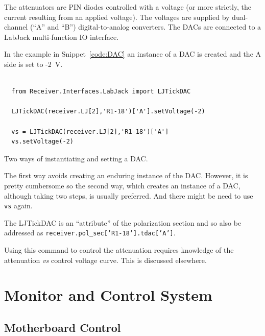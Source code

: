 \documentclass[letterpaper,11pt]{book}
\begin{document}
The attenuators are PIN diodes
controlled with a voltage (or more strictly, the current resulting from an
applied voltage).  The voltages are supplied by dual-channel (``A'' and
``B'') digital-to-analog converters.  The DACs are connected to a LabJack
multi-function IO interface.

In the example in Snippet~\ref{code:DAC}
an instance of a DAC is created and the A side is set to -2~V.
\begin{code}[h!tb]
\begin{center}
\begin{verbatim}

  from Receiver.Interfaces.LabJack import LJTickDAC
  
  LJTickDAC(receiver.LJ[2],'R1-18')['A'].setVoltage(-2)
  
  vs = LJTickDAC(receiver.LJ[2],'R1-18')['A']
  vs.setVoltage(-2)\end{verbatim}
\caption{\label{code:DAC}Two ways of instantiating and setting a DAC.}  
\end{center}
\end{code}
The first way avoids creating an enduring instance of the DAC.  However, it is
pretty cumbersome so the second way, which creates an instance of a DAC,
although taking two steps, is usually preferred.  And there might be need to
use {\tt vs} again.

The LJTickDAC is an ``attribute'' of the polarization section and so also be 
addressed as {\tt receiver.pol\_sec['R1-18'].tdac['A']}.

Using this command to control the attenuation requires knowledge of the 
attenuation {\it vs} control voltage curve.  This is discussed elsewhere.


\chapter{Monitor and Control System}\label{chap:MandC}

\section{Motherboard Control}
\end{document}
